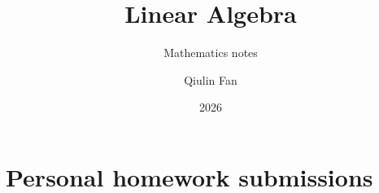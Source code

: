 \documentclass{../toolchain/latex/qlnotes-native}
\title{Linear Algebra}
\subtitle{Mathematics notes}
\author{Qiulin Fan}
\date{2026}
\begin{document}
\frontmatter
\maketitle
\tableofcontents
\mainmatter


























\clearpage

\chapter{Personal homework submissions}




















\end{document}
